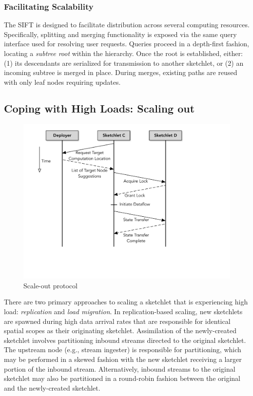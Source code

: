 \documentclass[9pt,journal,compsoc]{IEEEtran}
\begin{document}
\subsubsection{Facilitating Scalability}
The SIFT is designed to facilitate distribution across several computing resources. Specifically, splitting and merging functionality is exposed via the same query interface used for resolving user requests. Queries proceed in a depth-first fashion, locating a \emph{subtree root} within the hierarchy. Once the root is established, either: (1) its descendants are serialized for transmission to another sketchlet, or (2) an incoming subtree is merged in place. During merges, existing paths are reused with only leaf nodes requiring updates.

\subsection{Coping with High Loads: Scaling out}
\label{subsec:scaling-out}
%
\begin{figure}[h!]
    \centering
    \includegraphics[scale=0.4, valign=t]{figures/scale-out.pdf}
    \caption{Scale-out protocol}
    \label{fig:scale-out-protocol}    
    \vspace{-1em}
\end{figure}
There are two primary approaches to scaling a sketchlet that is experiencing high load: \emph{replication} and \emph{load migration}. In replication-based scaling, new sketchlets are spawned during high data arrival rates that are responsible for identical spatial scopes as their originating sketchlet. Assimilation of the newly-created sketchlet involves partitioning inbound streams directed to the original sketchlet. The upstream node (e.g., stream ingester) is responsible for partitioning, which may be performed in a skewed fashion with the new sketchlet receiving a larger portion of the inbound stream. Alternatively, inbound streams to the original sketchlet may also be partitioned in a round-robin fashion between the original and the newly-created sketchlet.
\end{document}
